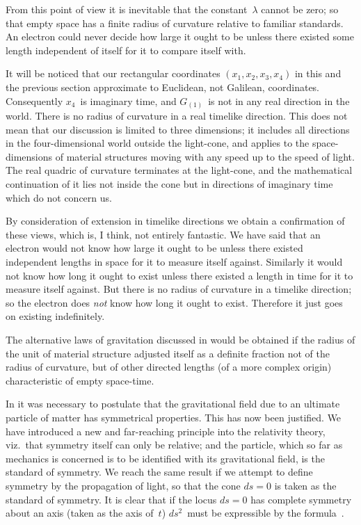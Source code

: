 \documentclass[12pt]{book}
\begin{document}
From this point of view it is inevitable that the constant~$\lambda$ cannot be
zero; so that empty space has a finite radius of curvature relative to familiar
standards. An electron could never decide how large it ought to be unless
there existed some length independent of itself for it to compare itself with.

It will be noticed that our rectangular coordinates $(x_{1}, x_{2}, x_{3}, x_{4})$ in this
and the previous section approximate to Euclidean, not Galilean, coordinates.
Consequently $x_{4}$~is imaginary time, and $G_{(1)}$~is not in any real direction
in the world. There is no radius of curvature in a real timelike direction.
This does not mean that our discussion is limited to three dimensions; it
includes all directions in the four-dimensional world outside the light-cone,
and applies to the space-dimensions of material structures moving with any
speed up to the speed of light. The real quadric of curvature terminates at
the light-cone, and the mathematical continuation of it lies not inside the
cone but in directions of imaginary time which do not concern us.

By consideration of extension in timelike directions we obtain a confirmation
of these views, which is, I think, not entirely fantastic. We have said that
an electron would not know how large it ought to be unless there existed independent
lengths in space for it to measure itself against. Similarly it would
not know how long it ought to exist unless there existed a length in time for
it to measure itself against. But there is no radius of curvature in a timelike
direction; so the electron does \emph{not} know how long it ought to exist. Therefore
it just goes on existing indefinitely.

The alternative laws of gravitation discussed in  would be obtained if
the radius of the unit of material structure adjusted itself as a definite fraction
not of the radius of curvature, but of other directed lengths (of a more complex
origin) characteristic of empty space-time.

In  it was necessary to postulate that the gravitational field due to an
ultimate particle of matter has symmetrical properties. This has now been
%
justified. We have introduced a new and far-reaching principle into the
relativity theory, viz.\ that symmetry itself can only be relative; and the
%
%
particle, which so far as mechanics is concerned is to be identified with its
gravitational field, is the standard of symmetry. We reach the same result if
we attempt to define symmetry by the propagation of light, so that the cone
$ds = 0$ is taken as the standard of symmetry. It is clear that if the locus
$ds = 0$ has complete symmetry about an axis (taken as the axis of~$t$) $ds^{2}$~must
be expressible by the formula~.
\end{document}
